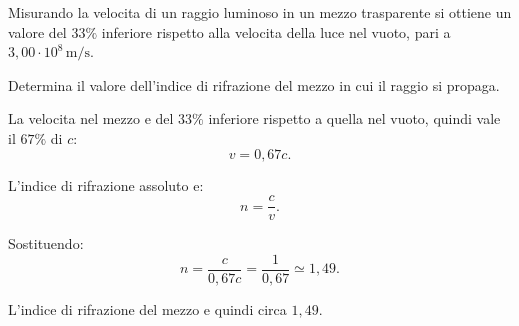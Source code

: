 
\begin{esercizio}
Misurando la velocita di un raggio luminoso in un mezzo trasparente si ottiene
un valore del \(33\%\) inferiore rispetto alla velocita della luce nel vuoto,
pari a \(3{,}00\cdot 10^8\,\mathrm{m/s}\).

Determina il valore dell'indice di rifrazione del mezzo in cui il raggio si
propaga.
\end{esercizio}

\begin{soluzione}
La velocita nel mezzo e del \(33\%\) inferiore rispetto a quella nel vuoto,
quindi vale il \(67\%\) di \(c\):
\[
v=0{,}67c.
\]

L'indice di rifrazione assoluto e:
\[
n=\frac{c}{v}.
\]

Sostituendo:
\[
n=\frac{c}{0{,}67c}
=\frac{1}{0{,}67}
\simeq 1{,}49.
\]

L'indice di rifrazione del mezzo e quindi circa \(1{,}49\).
\end{soluzione}
